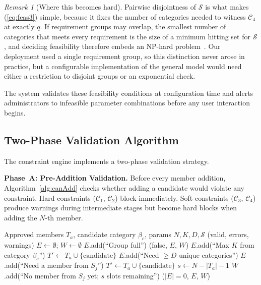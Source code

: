 \documentclass[11pt,a4paper]{article}
\theoremstyle{plain}
\theoremstyle{definition}
\theoremstyle{remark}
\newtheorem{remark}[theorem]{Remark}
\begin{document}
\begin{remark}[Where this becomes hard]
\label{rem:hardness}
Pairwise disjointness of $\mathcal{S}$ is what makes (\ref{eq:feas3}) simple, because it fixes the number of categories needed to witness $\mathcal{C}_4$ at exactly $q$. If requirement groups may overlap, the smallest number of categories that meets every requirement is the size of a minimum hitting set for $\mathcal{S}$, and deciding feasibility therefore embeds an NP-hard problem~\cite{karp1972}. Our deployment used a single requirement group, so this distinction never arose in practice, but a configurable implementation of the general model would need either a restriction to disjoint groups or an exponential check.
\end{remark}

The system validates these feasibility conditions at configuration time and alerts administrators to infeasible parameter combinations before any user interaction begins.

\subsection{Two-Phase Validation Algorithm}

The constraint engine implements a two-phase validation strategy.

\textbf{Phase~A: Pre-Addition Validation.} Before every member addition, Algorithm~\ref{alg:canAdd} checks whether adding a candidate would violate any constraint. Hard constraints ($\mathcal{C}_1$, $\mathcal{C}_2$) block immediately. Soft constraints ($\mathcal{C}_3$, $\mathcal{C}_4$) produce warnings during intermediate stages but become hard blocks when adding the $N$-th member.

\begin{algorithm}[htbp]
\caption{Pre-Addition Constraint Validation (\texttt{canAddMember})}
\label{alg:canAdd}
\small
\begin{algorithmic}[1]
\REQUIRE Approved members $T_a$, candidate category $\beta_c$, params $N, K, D, \mathcal{S}$
\ENSURE (valid, errors, warnings)
\STATE $E \gets \emptyset$; $W \gets \emptyset$
    \STATE $E$.add(``Group full'')
    \RETURN (false, $E$, $W$)
\ENDIF
{}
    \STATE $E$.add(``Max $K$ from category $\beta_c$'')
\ENDIF
{}
    \STATE {}
    \STATE $T' \gets T_a \cup \{\text{candidate}\}$
        \STATE $E$.add(``Need $\geq D$ unique categories'')
    \ENDIF
            \STATE $E$.add(``Need a member from $S_j$'')
        \ENDIF
    \ENDFOR
{}
    \STATE $T' \gets T_a \cup \{\text{candidate}\}$
            \STATE $s \gets N - |T_a| - 1$
            \STATE $W$.add(``No member from $S_j$ yet; $s$ slots remaining'')
        \ENDIF
    \ENDFOR
\ENDIF
\RETURN ($|E| = 0$, $E$, $W$)
\end{algorithmic}
\end{algorithm}
\end{document}
